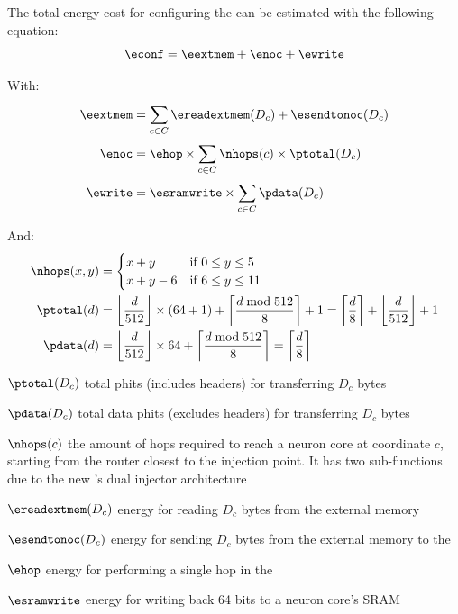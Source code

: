 The total energy cost for configuring the \graicore{} can be estimated with the following equation:
\begin{equation}
    \econf = \eextmem + \enoc + \ewrite
\end{equation}

With:
\begin{align*} 
\eextmem &= 
        \sum_{c \in C}^{}{\ereadextmem(D_c) + \esendtonoc(D_c)} \\
\enoc &=
    \ehop \times \sum_{c \in C}^{}{\nhops(c) \times \ptotal(D_c)} \\
\ewrite &=
    \esramwrite \times \sum_{c \in C}^{}{\pdata(D_c)}
\end{align*}

And:
\begin{align*} 
\nhops(x,y) &=
    \begin{cases} 
        x + y & \textrm{if } 0 \leq y \leq 5 \\
        x + y - 6 & \text{if } 6 \leq y \leq 11
    \end{cases}
\\
\ptotal(d) &=
    \left\lfloor \frac{d}{512} \right\rfloor \times (64 + 1) + \left\lceil \frac{d \bmod 512}{8} \right\rceil + 1 =
    \left\lceil \frac{d}{8} \right\rceil + \left\lfloor \frac{d}{512} \right\rfloor + 1 
\\
\pdata(d) &=
    \left\lfloor \frac{d}{512} \right\rfloor \times 64 + \left\lceil \frac{d \bmod 512}{8} \right\rceil =
    \left\lceil \frac{d}{8} \right\rceil
\end{align*}

\begin{eqexpl}[15mm]
    \item{$\ptotal(D_c)$} total phits (includes headers) for transferring $D_c$ bytes
    \item{$\pdata(D_c)$} total data phits (excludes headers) for transferring $D_c$ bytes
    \item{$\nhops(c)$} the amount of hops required to reach a neuron core at coordinate $c$, starting from the router closest to the injection point. It has two sub-functions due to the new \confignoc{}'s dual injector architecture
    \item{$\ereadextmem(D_c)$} energy for reading $D_c$ bytes from the external memory
    \item{$\esendtonoc(D_c)$} energy for sending $D_c$ bytes from the external memory to the \confignoc{}
    \item{$\ehop$} energy for performing a single hop in the \confignoc{}
    \item{$\esramwrite$} energy for writing back 64 bits to a neuron core's SRAM
\end{eqexpl}


